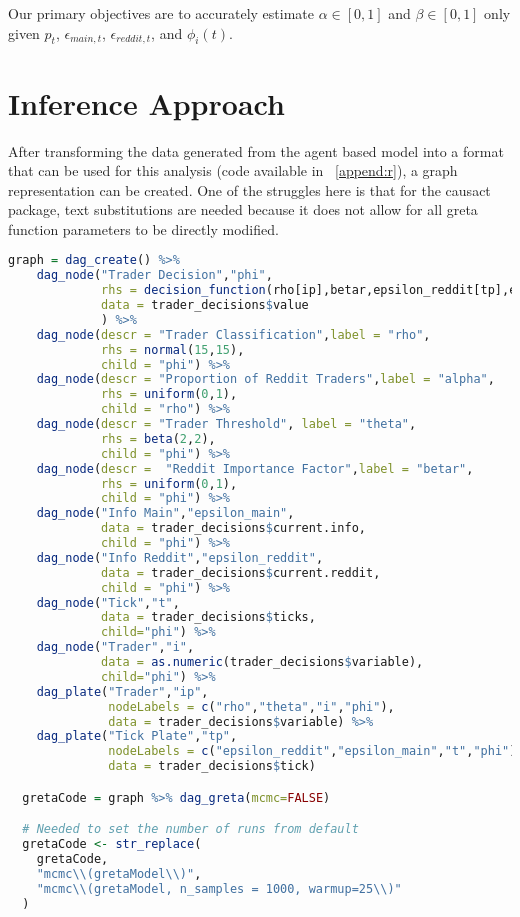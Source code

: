 \documentclass[a4paper, 11pt]{report}
\let\Oldsection\section
\renewcommand{\section}{\FloatBarrier\Oldsection}
\begin{document}
Our primary objectives are to accurately estimate $\alpha \in [0,1]$ and $\beta \in [0,1]$ only given $p_{t}$, $\epsilon_{main,t}$, $\epsilon_{reddit,t}$, and $\phi_{i}(t)$.

\section{Inference Approach}

After transforming the data generated from the agent based model into a format that can be used for this analysis (code available in ~\autoref{append:r}), a graph representation can be created. One of the struggles here is that for the causact package, text substitutions are needed because it does not allow for all greta function parameters to be directly modified.
\begin{lstlisting}[language=R]
graph = dag_create() %>%
    dag_node("Trader Decision","phi",
             rhs = decision_function(rho[ip],betar,epsilon_reddit[tp],epsilon_main[tp],theta[ip]),
             data = trader_decisions$value
             ) %>%
    dag_node(descr = "Trader Classification",label = "rho",
             rhs = normal(15,15),
             child = "phi") %>%
    dag_node(descr = "Proportion of Reddit Traders",label = "alpha",
             rhs = uniform(0,1),
             child = "rho") %>%
    dag_node(descr = "Trader Threshold", label = "theta",
             rhs = beta(2,2),
             child = "phi") %>%
    dag_node(descr =  "Reddit Importance Factor",label = "betar",
             rhs = uniform(0,1),
             child = "phi") %>%
    dag_node("Info Main","epsilon_main",
             data = trader_decisions$current.info,
             child = "phi") %>%
    dag_node("Info Reddit","epsilon_reddit",
             data = trader_decisions$current.reddit,
             child = "phi") %>%
    dag_node("Tick","t",
             data = trader_decisions$ticks,
             child="phi") %>%
    dag_node("Trader","i",
             data = as.numeric(trader_decisions$variable),
             child="phi") %>%
    dag_plate("Trader","ip",
              nodeLabels = c("rho","theta","i","phi"),
              data = trader_decisions$variable) %>%
    dag_plate("Tick Plate","tp",
              nodeLabels = c("epsilon_reddit","epsilon_main","t","phi"),
              data = trader_decisions$tick)

  gretaCode = graph %>% dag_greta(mcmc=FALSE)

  # Needed to set the number of runs from default
  gretaCode <- str_replace(
    gretaCode, 
    "mcmc\\(gretaModel\\)", 
    "mcmc\\(gretaModel, n_samples = 1000, warmup=25\\)"
  )
  

\end{lstlisting}
\end{document}
